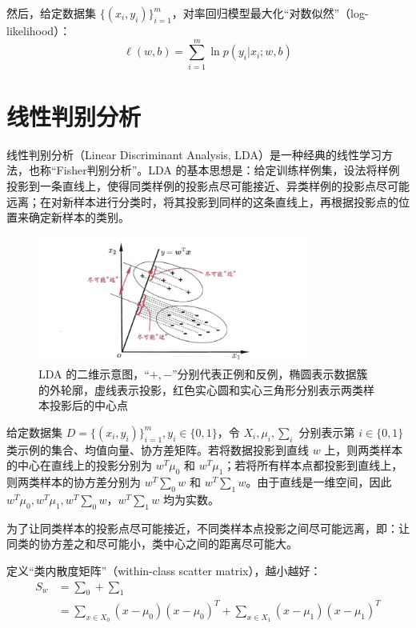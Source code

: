 \documentclass[12pt, a4paper]{article} %
\begin{document}
然后，给定数据集 $\{(x_i, y_i)\}_{i = 1}^{m}$，对率回归模型最大化“对数似然”（log-likelihood）：
\begin{equation*}
    \ell (w,b) = \sum\limits_{i = 1}^m {\ln p({y_i}|{x_i};w,b)}
\end{equation*}

\section{线性判别分析}

线性判别分析（Linear Discriminant Analysis, LDA）是一种经典的线性学习方法，也称“Fisher判别分析”。LDA 的基本思想是：给定训练样例集，设法将样例投影到一条直线上，使得同类样例的投影点尽可能接近、异类样例的投影点尽可能远离；在对新样本进行分类时，将其投影到同样的这条直线上，再根据投影点的位置来确定新样本的类别。

\begin{figure}[H]
    \centering
    \includegraphics[width=0.8\textwidth]{../img/3-3-LDA的二维示意图.png}
    \caption{LDA 的二维示意图，“$+, -$”分别代表正例和反例，椭圆表示数据簇的外轮廓，虚线表示投影，红色实心圆和实心三角形分别表示两类样本投影后的中心点}
    \label{fig:label}
\end{figure}

给定数据集 $D = \{(x_i, y_i)\}_{i = 1}^{m}, y_i \in \{0, 1\}$，令 $X_i, \mu_i, \sum_i$ 分别表示第 $i \in \{0, 1\}$ 类示例的集合、均值向量、协方差矩阵。若将数据投影到直线 $w$ 上，则两类样本的中心在直线上的投影分别为 $w^T\mu_0$ 和 $w^T \mu_1$；若将所有样本点都投影到直线上，则两类样本的协方差分别为 $w^T \sum_0 w$ 和 $w^T \sum_1 w$。由于直线是一维空间，因此 $w^T\mu_0, w^T \mu_1, w^T \sum_0 w， w^T \sum_1 w$ 均为实数。

为了让同类样本的投影点尽可能接近，不同类样本点投影之间尽可能远离，即：让同类的协方差之和尽可能小，类中心之间的距离尽可能大。

定义“类内散度矩阵”（within-class scatter matrix），越小越好：
\begin{equation*}
    \begin{array}{*{20}{l}}
        {{S_w}}&{ = {\sum _0} + {\sum _1}}\\
        {}&{ = \sum\limits_{x \in {X_0}} {(x - {\mu _0}){{(x - {\mu _0})}^T}}  + \sum\limits_{x \in {X_1}} {(x - {\mu _1}){{(x - {\mu _1})}^T}} }
    \end{array}
\end{equation*}
\end{document}
